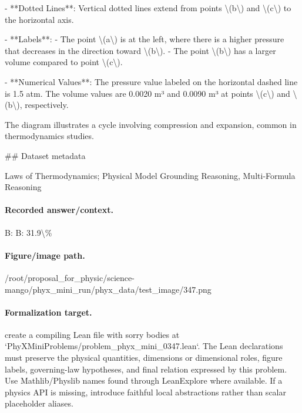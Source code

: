 - **Dotted Lines**: Vertical dotted lines extend from points \textbackslash{}(b\textbackslash{}) and \textbackslash{}(c\textbackslash{}) to the horizontal axis.

- **Labels**:
  - The point \textbackslash{}(a\textbackslash{}) is at the left, where there is a higher pressure that decreases in the direction toward \textbackslash{}(b\textbackslash{}).
  - The point \textbackslash{}(b\textbackslash{}) has a larger volume compared to point \textbackslash{}(c\textbackslash{}).

- **Numerical Values**: The pressure value labeled on the horizontal dashed line is 1.5 atm. The volume values are 0.0020 m³ and 0.0090 m³ at points \textbackslash{}(c\textbackslash{}) and \textbackslash{}(b\textbackslash{}), respectively.

The diagram illustrates a cycle involving compression and expansion, common in thermodynamics studies.

\#\# Dataset metadata

Laws of Thermodynamics; Physical Model Grounding Reasoning, Multi-Formula Reasoning

\paragraph{Recorded answer/context.}
B: B: 31.9\textbackslash{}\%

\paragraph{Figure/image path.}
/root/proposal\_for\_physic/science-mango/phyx\_mini\_run/phyx\_data/test\_image/347.png

\paragraph{Formalization target.}
create a compiling Lean file with sorry bodies at `PhyXMiniProblems/problem\_phyx\_mini\_0347.lean`. The Lean declarations must preserve the physical quantities, dimensions or dimensional roles, figure labels, governing-law hypotheses, and final relation expressed by this problem.
Use Mathlib/Physlib names found through LeanExplore where available. If a physics API is missing, introduce faithful local abstractions rather than scalar placeholder aliases.

